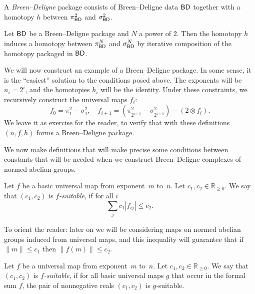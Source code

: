 \begin{definition}
  \label{BD_package}
  \leanok
  A \emph{Breen--Deligne} package consists of Breen--Deligne data $\mathsf{BD}$
  together with a homotopy $h$ between $\pi^2_{\mathsf{BD}}$ and $\sigma^2_{\mathsf{BD}}$. 
\end{definition}

\begin{definition}
  \label{BD_h_mul}
  \leanok
  Let $\mathsf{BD}$ be a Breen--Deligne package and $N$ a power of $2$.
  Then the homotopy $h$ induces a homotopy
  between $\pi^N_{\mathsf{BD}}$ and $\sigma^N_{\mathsf{BD}}$ by iterative composition
  of the homotopy packaged in $\mathsf{BD}$.
\end{definition}

\begin{definition}
  \label{BD_eg}
  \leanok
  We will now construct an example of a Breen--Deligne package.
  In some sense, it is the ``easiest'' solution to the conditions posed above.
  The exponents will be $n_i = 2^i$, and the homotopies $h_i$ will be the identity.
  Under these constraints, we recursively construct the universal maps $f_i$:
  \[
    f_0 = \pi^2_1 - \sigma^2_1,
    \quad
    f_{i+1} = (\pi^2_{2^{i+1}} - \sigma^2_{2^{i+1}}) - (2 \otimes f_i).
  \]
  We leave it as exercise for the reader, to verify that
  with these definitions $(n, f, h)$ forms a Breen--Deligne package.
\end{definition}

We now make definitions that will make precise
some conditions between constants that will be needed
when we construct Breen--Deligne complexes of normed abelian groups.

\begin{definition}
  \label{basic_suitable}
  \leanok
  Let $f$ be a basic universal map from exponent~$m$ to~$n$.
  Let $c_1, c_2 \in \mathbb R_{\ge 0}$.
  We say that $(c_1, c_2)$ is \emph{$f$-suitable}, if for all $i$
  \[
    \sum_j c_1|f_{ij}| \le c_2.
  \]
\end{definition}

To orient the reader:
later on we will be considering maps on normed abelian groups induced from universal maps,
and this inequality will guarantee that if $\|m\|\leq c_1$ then $\|f(m)\|\leq c_2$.

\begin{definition}
  \label{universal_suitable}
  \leanok
  Let $f$ be a universal map from exponent~$m$ to~$n$.
  Let $c_1, c_2 \in \mathbb R_{\ge 0}$.
  We say that $(c_1, c_2)$ is \emph{$f$-suitable},
  if for all basic universal maps $g$
  that occur in the formal sum $f$,
  the pair of nonnegative reals $(c_1, c_2)$ is $g$-suitable.
\end{definition}

